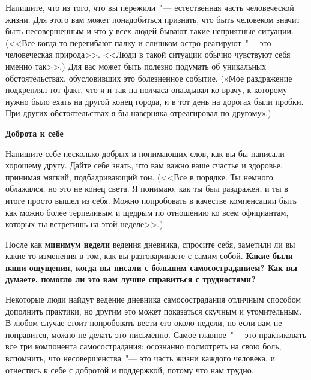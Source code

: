 Напишите, что из того, что вы пережили~"--- естественная часть человеческой жизни. Для этого вам может понадобиться признать, что быть человеком значит быть несовершенным и что у всех людей бывают такие неприятные ситуации. (<<Все когда-то перегибают палку и слишком остро реагируют~"--- это человеческая природа>>. <<Люди в такой ситуации обычно чувствуют себя именно так>>.) Для вас может быть полезно подумать об уникальных обстоятельствах, обусловивших это болезненное событие. («Мое раздражение подкреплял тот факт, что я и так на полчаса опаздывал ко врачу, к которому нужно было ехать на другой конец города, и в тот день на дорогах были пробки. При других обстоятельствах я бы наверняка отреагировал по-другому».) 
\vspace{3ex}

\textbf{Доброта к себе}

Напишите себе несколько добрых и понимающих слов, как вы бы написали хорошему другу. Дайте себе знать, что вам важно ваше счастье и здоровье, принимая мягкий, подбадривающий тон. (<<Все в порядке. Ты немного облажался, но это не конец света. Я понимаю, как ты был раздражен, и ты в итоге просто вышел из себя. Можно попробовать в качестве компенсации быть как можно более терпеливым и щедрым по отношению ко всем официантам, которых ты встретишь на этой неделе>>.) 

\vspace{5ex}


\vspace{3ex}
После как \textbf{минимум недели} ведения дневника, спросите себя, заметили ли вы какие-то изменения в том, как вы разговариваете с самим собой. \textbf{Какие были ваши ощущения, когда вы писали с б\'{о}льшим самосостраданием? Как вы думаете, помогло ли это вам лучше справиться с трудностями?}

Некоторые люди найдут ведение дневника самосострадания отличным способом дополнить практики, но другим это может показаться скучным и утомительным. В любом случае стоит попробовать вести его около недели, но если вам не понравится, можно не делать это письменно. Самое главное~"--- это практиковать все три компонента самосострадания: осознанно посмотреть на свою боль, вспомнить, что несовершенства~"--- это часть жизни каждого человека, и отнестись к себе с добротой и поддержкой, потому что нам трудно.



